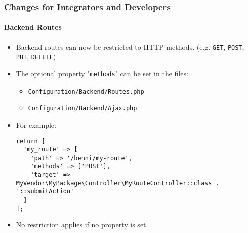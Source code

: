 %

\begin{frame}[fragile]
	\frametitle{Changes for Integrators and Developers}
	\framesubtitle{Backend Routes}


	\begin{itemize}
		\item Backend routes can now be restricted to HTTP methods.\newline
			\small(e.g. \texttt{GET}, \texttt{POST}, \texttt{PUT}, \texttt{DELETE})
		\item The optional property "\texttt{methods}" can be set in the files:
			\begin{itemize}\smaller
				\item \texttt{Configuration/Backend/Routes.php}
				\item \texttt{Configuration/Backend/Ajax.php}
			\end{itemize}
			\vspace{0.2cm}
		\item For example:
\begin{lstlisting}
return [
  'my_route' => [
    'path' => '/benni/my-route',
    'methods' => ['POST'],
    'target' => MyVendor\MyPackage\Controller\MyRouteController::class . '::submitAction'
  ]
];
\end{lstlisting}

		\item No restriction applies if no property is set.

	\end{itemize}

\end{frame}

